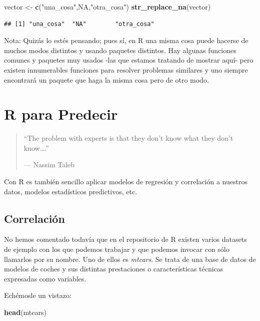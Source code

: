 \documentclass[]{book}
\newenvironment{Shaded}{\begin{snugshade}}{\end{snugshade}}
\newcommand{\KeywordTok}[1]{\textcolor[rgb]{0.13,0.29,0.53}{\textbf{{#1}}}}
\newcommand{\StringTok}[1]{\textcolor[rgb]{0.31,0.60,0.02}{{#1}}}
\newcommand{\OtherTok}[1]{\textcolor[rgb]{0.56,0.35,0.01}{{#1}}}
\newcommand{\NormalTok}[1]{{#1}}
\theoremstyle{definition}
\theoremstyle{definition}
\theoremstyle{remark}
\begin{document}
\begin{Shaded}
\begin{Highlighting}[]
\NormalTok{vector <-}\StringTok{ }\KeywordTok{c}\NormalTok{(}\StringTok{"una_cosa"}\NormalTok{,}\OtherTok{NA}\NormalTok{,}\StringTok{"otra_cosa"}\NormalTok{)}
\KeywordTok{str_replace_na}\NormalTok{(vector)}
\end{Highlighting}
\end{Shaded}

\begin{verbatim}
## [1] "una_cosa"  "NA"        "otra_cosa"
\end{verbatim}

Nota: Quizás lo estés pensando; pues sí, en R una misma cosa puede
hacerse de muchos modos distintos y usando paquetes distintos. Hay
algunas funciones comunes y paquetes muy usados -las que estamos
tratando de mostrar aquí- pero existen innumerables funciones para
resolver problemas similares y uno siempre encontrará un paquete que
haga la misma cosa pero de otro modo.

\chapter{R para Predecir}\label{r-para-predecir}

\begin{quote}
``The problem with experts is that they don't know what they don't
know\ldots{}.''

--- Nassim Taleb
\end{quote}

Con R es también sencillo aplicar modelos de regresión y correlación a
nuestros datos, modelos estadísticos predictivos, etc.

\section{Correlación}\label{correlacion}

No hemos comentado todavía que en el repositorio de R existen varios
datasets de ejemplo con los que podemos trabajar y que podemos invocar
con sólo llamarlos por su nombre. Uno de ellos es \emph{mtcars}. Se
trata de una base de datos de modelos de coches y sus distintas
prestaciones o características técnicas expresadas como variables.

Echémosle un vistazo:

\begin{Shaded}
\begin{Highlighting}[]
\KeywordTok{head}\NormalTok{(mtcars)}
\end{Highlighting}
\end{Shaded}
\end{document}
